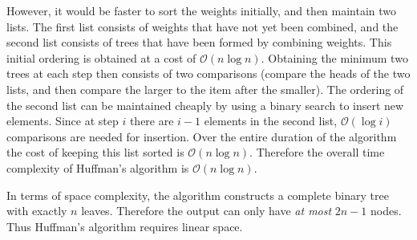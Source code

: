 \documentclass[12pt]{article}
\begin{document}
However, it would be faster to sort the weights initially, and then maintain two lists.  The first list consists of weights that have not yet been combined, and the second list consists of trees that have been formed by combining weights.  
This initial ordering is obtained at a cost of $\mathcal{O}(n\log n)$.
Obtaining the minimum two trees at each step then consists of two comparisons (compare the heads of the two lists, and then compare the larger to the item after the smaller).  The ordering of the second list can be maintained cheaply by using a binary search to insert new elements.  Since at step $i$ there are $i-1$ elements in the second list, $\mathcal{O}(\log i)$ comparisons are needed for insertion.
Over the entire duration of the algorithm the cost of keeping this list sorted is $\mathcal{O}(n\log n)$.  Therefore the overall time complexity of Huffman's algorithm is $\mathcal{O}(n\log n)$.

In terms of space complexity, the algorithm constructs a complete binary tree with exactly $n$ leaves.  Therefore the output can only have \emph{at most} $2n-1$ nodes.  Thus Huffman's algorithm requires linear space.
\end{document}
